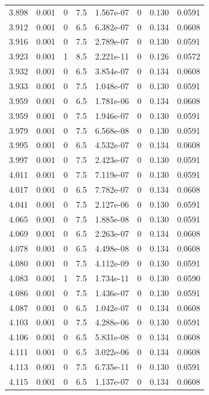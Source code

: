 \documentclass[preview]{standalone}
\begin{document}
{{{{{{{{{{{\begin{tabular}{L{1.2cm}C{1.2cm} C{0.3cm}C{0.5cm} C{1.4cm}C{1.4cm} C{1.4cm}C{1.4cm}}
  3.898  &  0.001  & 0     & 7.5 &  1.567e-07  & 0  & 0.130 &  0.0591   \\ 
  3.912  &  0.001  & 0     & 6.5 &  6.382e-07  & 0  & 0.134 &  0.0608   \\ 
  3.916  &  0.001  & 0     & 7.5 &  2.789e-07  & 0  & 0.130 &  0.0591   \\ 
  3.923  &  0.001  & 1     & 8.5 &  2.221e-11  & 0  & 0.126 &  0.0572   \\ 
  3.932  &  0.001  & 0     & 6.5 &  3.854e-07  & 0  & 0.134 &  0.0608   \\ 
  3.933  &  0.001  & 0     & 7.5 &  1.048e-07  & 0  & 0.130 &  0.0591   \\ 
  3.959  &  0.001  & 0     & 6.5 &  1.781e-06  & 0  & 0.134 &  0.0608   \\ 
  3.959  &  0.001  & 0     & 7.5 &  1.946e-07  & 0  & 0.130 &  0.0591   \\ 
  3.979  &  0.001  & 0     & 7.5 &  6.568e-08  & 0  & 0.130 &  0.0591   \\ 
  3.995  &  0.001  & 0     & 6.5 &  4.532e-07  & 0  & 0.134 &  0.0608   \\ 
  3.997  &  0.001  & 0     & 7.5 &  2.423e-07  & 0  & 0.130 &  0.0591   \\ 
  4.011  &  0.001  & 0     & 7.5 &  7.119e-07  & 0  & 0.130 &  0.0591   \\ 
  4.017  &  0.001  & 0     & 6.5 &  7.782e-07  & 0  & 0.134 &  0.0608   \\ 
  4.041  &  0.001  & 0     & 7.5 &  2.127e-06  & 0  & 0.130 &  0.0591   \\ 
  4.065  &  0.001  & 0     & 7.5 &  1.885e-08  & 0  & 0.130 &  0.0591   \\ 
  4.069  &  0.001  & 0     & 6.5 &  2.263e-07  & 0  & 0.134 &  0.0608   \\ 
  4.078  &  0.001  & 0     & 6.5 &  4.498e-08  & 0  & 0.134 &  0.0608   \\ 
  4.080  &  0.001  & 0     & 7.5 &  4.112e-09  & 0  & 0.130 &  0.0591   \\ 
  4.083  &  0.001  & 1     & 7.5 &  1.734e-11  & 0  & 0.130 &  0.0590   \\ 
  4.086  &  0.001  & 0     & 7.5 &  1.436e-07  & 0  & 0.130 &  0.0591   \\ 
  4.087  &  0.001  & 0     & 6.5 &  1.042e-07  & 0  & 0.134 &  0.0608   \\ 
  4.103  &  0.001  & 0     & 7.5 &  4.288e-06  & 0  & 0.130 &  0.0591   \\ 
  4.106  &  0.001  & 0     & 6.5 &  5.831e-08  & 0  & 0.134 &  0.0608   \\ 
  4.111  &  0.001  & 0     & 6.5 &  3.022e-06  & 0  & 0.134 &  0.0608   \\ 
  4.113  &  0.001  & 0     & 7.5 &  6.735e-11  & 0  & 0.130 &  0.0591   \\ 
  4.115  &  0.001  & 0     & 6.5 &  1.137e-07  & 0  & 0.134 &  0.0608   \\ 
\hline 
\end{tabular} 

}}}}}}}}}}}
\end{document}
